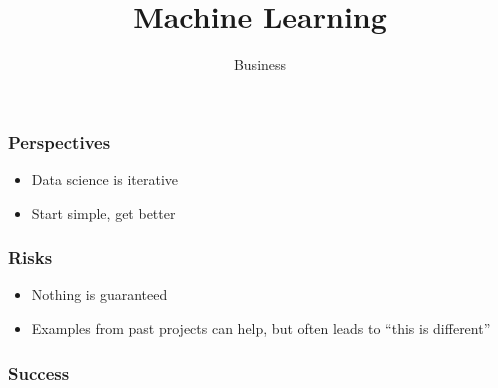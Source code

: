 
\title
{Machine Learning}
\subtitle{Business}




\begin{frame}
  \titlepage
\end{frame}

\begin{frame}[t]
  \frametitle{Perspectives}

  \vspace{1cm}
  \begin{itemize}
  \item Data science is iterative
  \item Start simple, get better
  \end{itemize}

\end{frame}

\begin{frame}[t]
  \frametitle{Risks}

  \vspace{1cm}
  \begin{itemize}
  \item Nothing is guaranteed
  \item Examples from past projects can help, but often leads to ``this is different''
  \end{itemize}
\end{frame}

\begin{frame}[t]
  \frametitle{Success}
  \vspace{2cm}
  \centerline{}
  \vspace{1cm}
\end{frame}

